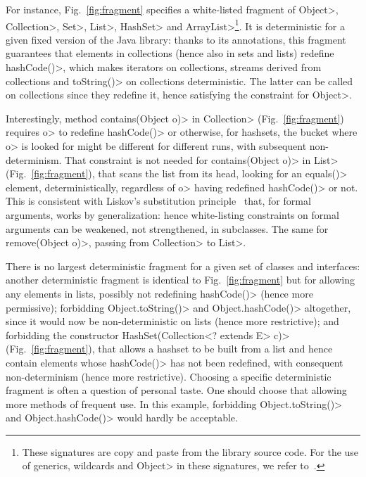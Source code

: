For instance, Fig.~\ref{fig:fragment}
specifies a white-listed fragment of \<Object>,
\<Collection>, \<Set>, \<List>, \<HashSet> and
\<ArrayList>\footnote{These signatures are copy and paste from the
library source code. For the use of generics, wildcards and
\<Object> in these signatures, we refer to~\cite{NaftalinW06}.}.
It is deterministic for a given fixed version of the Java library:
thanks to its annotations, this fragment guarantees that elements in collections
(hence also in sets and lists) redefine \<hashCode()>, which makes iterators
on collections, streams derived from collections and \<toString()> on collections
deterministic. The latter can be called on collections since they redefine it,
hence satisfying the constraint for \<Object>.

Interestingly, method
\<contains(Object o)> in \<Collection> (Fig.~\ref{fig:fragment})
requires \<o> to redefine \<hashCode()>
or otherwise, for hashsets, the bucket where \<o> is looked for might be different
for different runs, with subsequent non-determinism.
That constraint is not needed for \<contains(Object o)> in \<List>
(Fig.~\ref{fig:fragment}), that scans the list from its head,
looking for an \<equals()> element, deterministically,
regardless of \<o> having redefined \<hashCode()> or not. This is consistent with
Liskov's substitution principle~\cite{LiskovW94} that,
for formal arguments, works by generalization:
hence white-listing constraints on formal arguments can be weakened, not strengthened,
in subclasses. The same for \<remove(Object o)>, passing from \<Collection> to \<List>.

There is no largest deterministic fragment
for a given set of classes and interfaces:
another deterministic fragment is identical to
Fig.~\ref{fig:fragment} but for allowing any elements in lists, possibly not redefining
\<hashCode()> (hence more permissive);
forbidding \<Object.toString()> and \<Object.hashCode()> altogether,
since it would now be non-deterministic on lists (hence
more restrictive); and forbidding the constructor
\<HashSet(Collection$\text{<}$? extends E$\text{>}$ c)>
(Fig.~\ref{fig:fragment}), that allows a hashset to be
built from a list and hence contain elements whose \<hashCode()> has not been redefined,
with consequent non-determinism (hence more restrictive). Choosing a specific
deterministic fragment is often a question of personal taste.
One should choose that allowing more methods of frequent use. In this example,
forbidding \<Object.toString()> and \<Object.hashCode()> would hardly be acceptable.
